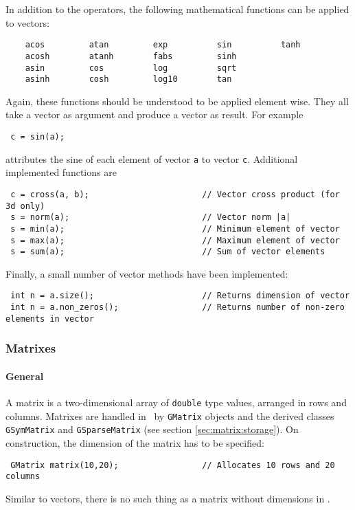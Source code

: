 \documentclass{article}[12pt,a4]
\begin{document}
In addition to the operators, the following mathematical functions 
can be applied to vectors:
\begin{verbatim}
    acos         atan         exp          sin          tanh
    acosh        atanh        fabs         sinh
    asin         cos          log          sqrt
    asinh        cosh         log10        tan
\end{verbatim}
Again, these functions should be understood to be applied element wise.
They all take a vector as argument and produce a vector as result.
For example
\begin{verbatim}
 c = sin(a);
\end{verbatim}
attributes the sine of each element of vector {\tt a} to vector 
{\tt c}.
Additional implemented functions are
\begin{verbatim}
 c = cross(a, b);                       // Vector cross product (for 3d only)
 s = norm(a);                           // Vector norm |a|
 s = min(a);                            // Minimum element of vector
 s = max(a);                            // Maximum element of vector
 s = sum(a);                            // Sum of vector elements
\end{verbatim}
Finally, a small number of vector methods have been implemented:
\begin{verbatim}
 int n = a.size();                      // Returns dimension of vector
 int n = a.non_zeros();                 // Returns number of non-zero elements in vector
\end{verbatim}

\subsubsection{Matrixes}

\paragraph{General}

A matrix is a two-dimensional array of {\tt double} type values, 
arranged in rows and columns.
Matrixes are handled in \this\ by {\tt GMatrix} objects and the 
derived classes {\tt GSymMatrix} and {\tt GSparseMatrix} (see section 
\ref{sec:matrix:storage}).
On construction, the dimension of the matrix has to be specified:
\begin{verbatim}
 GMatrix matrix(10,20);                 // Allocates 10 rows and 20 columns
\end{verbatim}
Similar to vectors, there is no such thing as a matrix without 
dimensions in \this.
\end{document}
